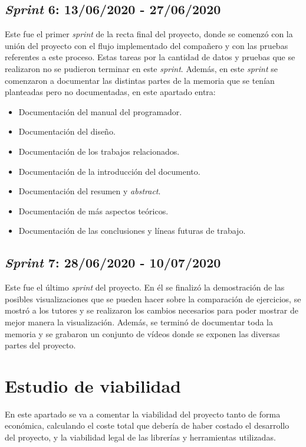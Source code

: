 \subsection{\textit{Sprint} 6: 13/06/2020 - 27/06/2020}
Este fue el primer \textit{sprint} de la recta final del proyecto, donde se comenzó con la unión del proyecto con el flujo implementado del compañero y con las pruebas referentes a este proceso. Estas tareas por la cantidad de datos y pruebas que se realizaron no se pudieron terminar en este \textit{sprint}. Además, en este \textit{sprint} se comenzaron a documentar las distintas partes de la memoria que se tenían planteadas pero no documentadas, en este apartado entra:
\begin{itemize}
	\item Documentación del manual del programador.
	\item Documentación del diseño.
	\item Documentación de los trabajos relacionados.
	\item Documentación de la introducción del documento.
	\item Documentación del resumen y \textit{abstract}.
	\item Documentación de más aspectos teóricos.
	\item Documentación de las conclusiones y líneas futuras de trabajo.
\end{itemize}

\subsection{\textit{Sprint} 7: 28/06/2020 - 10/07/2020}
Este fue el último \textit{sprint} del proyecto. En él se finalizó la demostración de las posibles visualizaciones que se pueden hacer sobre la comparación de ejercicios, se mostró a los tutores y se realizaron los cambios necesarios para poder mostrar de mejor manera la visualización. Además, se terminó de documentar toda la memoria y se grabaron un conjunto de vídeos donde se exponen las diversas partes del proyecto.

\section{Estudio de viabilidad}

En este apartado se va a comentar la viabilidad del proyecto tanto de forma económica, calculando el coste total que debería de haber costado el desarrollo del proyecto, y la viabilidad legal de las librerías y herramientas utilizadas.

